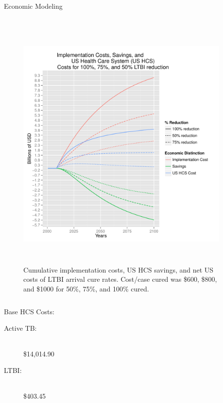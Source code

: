 \documentclass[final]{beamer}
\begin{document}
\begin{frame}
\begin{columns}
\begin{column}{.3\textwidth}
\begin{block}{Economic Modeling}
\begin{block}{}
\begin{column}{.66\textwidth}
\begin{figure}[h]
\begin{center}
                \includegraphics[width=\textwidth,height=13cm]{EnLTBIRedGroupCost.pdf}
              \end{center}
              \caption{Cumulative implementation costs, US HCS savings, and net
                       US costs of LTBI arrival cure rates. Cost/case cured was
                       \$600, \$800, and \$1000 for 50\%, 75\%, and 100\%
                       cured.}
              \label{fig:redEnLTBI_costs}
            \end{figure}
          \end{column}
          \begin{column}{.26\textwidth}
            Base HCS Costs:
            \begin{description}
              \item[Active TB:]\hfill \\ 
                \$14,014.90
              \item[LTBI:]\hfill \\ 
                \$403.45
            \end{description}
          \end{column}
        \end{block}
      \end{block}
    \end{column}
    \begin{column}{.3\textwidth}

\end{column}
\end{columns}
\end{frame}
\end{document}
